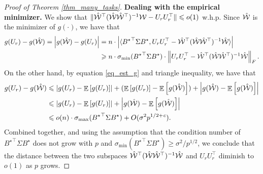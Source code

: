 \begin{proof}[Proof of Theorem \ref{thm_many_tasks}]
	\medskip
	\noindent\textbf{Dealing with the empirical minimizer.}
	We show that $\|\hat{{\mathcal W}}^{\top} (\hat{{\mathcal W}}\hat{{\mathcal W}}^{\top})^{-1} {\mathcal W} - U_r U_r^{\top}\| \leqslant o(1)$ w.h.p.
	Since $\hat{{\mathcal W}}$ is the minimizer of $g(\cdot)$, we have that
	\begin{align*}
		g(U_r) - g(\hat{{\mathcal W}}) = {\left| {g(\hat{{\mathcal W}}) - g(U_r)} \right|} &= n \cdot {\left| {\langle {B^{\star}}^{\top} \Sigma B^{\star}, U_r U_r^{\top} - \hat{{\mathcal W}}^{\top} (\hat{{\mathcal W}}\hat{{\mathcal W}}^{\top})^{-1} \hat{{\mathcal W}} \rangle} \right|}\\
		&\geqslant n \cdot \sigma_{\min}({B^{\star}}^{\top} \Sigma B^{\star}) \cdot \left\| U_r U_r^{\top} - \hat{{\mathcal W}}^{\top} (\hat{{\mathcal W}}\hat{{\mathcal W}}^{\top})^{-1} \hat{{\mathcal W}} \right\|_{F}.
	\end{align*}
	On the other hand, by equation \eqref{eq_est_g} and triangle inequality, we have that
	\begin{align*}
		g(U_r) - g(\hat{{\mathcal W}}) &\leqslant {\left| {g(U_r) - \mathop{\mathbb{E}}\left[ g(U_r) \right]} \right|} + (\mathop{\mathbb{E}}\left[ g(U_r) \right] - \mathop{\mathbb{E}}\left[ g(\hat{{\mathcal W}}) \right]) + {\left| {g(\hat{{\mathcal W}}) - \mathop{\mathbb{E}}\left[ g(\hat{{\mathcal W}}) \right]} \right|} \\
		&\leqslant {\left| {g(U_r) - \mathop{\mathbb{E}}\left[ g(U_r) \right]} \right|} +{\left| {g(\hat{{\mathcal W}}) - \mathop{\mathbb{E}}\left[ g(\hat{{\mathcal W}}) \right]} \right|} \\
		&\leqslant o(n) \cdot \sigma_{\max}({B^{\star}}^{\top} \Sigma B^{\star}) + O(\sigma^2 p^{1/2 +{\mathit{c}}}).
	\end{align*}
	Combined together, and using the assumption that the condition number of ${B^{\star}}^{\top}\Sigma B^{\star}$ does not grow with $p$ and $\sigma_{\min}({B^{\star}}^{\top} \Sigma B^{\star}) \ge \sigma^2 / p^{1/2}$, we conclude that the distance between the two subspaces $\hat{{\mathcal W}}^{\top}(\hat{{\mathcal W}}\hat{{\mathcal W}}^{\top})^{-1}\hat{{\mathcal W}}$ and $U_r U_r^{\top}$ diminish to $o(1)$ as $p$ grows.


\end{proof}
